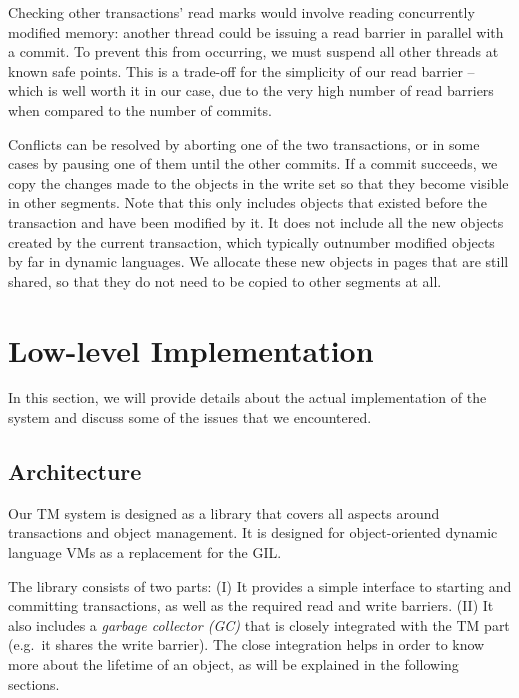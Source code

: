 \documentclass{sigplanconf}
\begin{document}
\begin{description}
  Checking other transactions' read marks would involve reading
  concurrently modified memory: another thread could be issuing a read
  barrier in parallel with a commit.  To prevent this from occurring, we
  must suspend all other threads at known safe points.  This is a
  trade-off for the simplicity of our read barrier -- which is well
  worth it in our case, due to the very high number of read barriers
  when compared to the number of commits.

\end{description}

Conflicts can be resolved by aborting one of the two transactions, or
in some cases by pausing one of them until the other commits.  If a
commit succeeds, we copy the changes made to the objects in the write
set so that they become visible in other segments.  Note that this
only includes objects that existed before the transaction and have
been modified by it.  It does not include all the new objects created
by the current transaction, which typically outnumber modified objects
by far in dynamic languages.  We allocate these new objects in pages
that are still shared, so that they do not need to be copied to other
segments at all.



\section{Low-level Implementation\label{sub:Low-level-Implementation}}

In this section, we will provide details about the actual
implementation of the system and discuss some of the issues that we
encountered.


\subsection{Architecture}

Our TM system is designed as a library that covers all aspects around
transactions and object management. It is designed for object-oriented
dynamic language VMs as a replacement for the GIL.

The library consists of two parts: (I) It provides a simple interface
to starting and committing transactions, as well as the required read
and write barriers. (II) It also includes a \emph{garbage collector
(GC)} that is closely integrated with the TM part (e.g.\ it shares the
write barrier). The close integration helps in order to know more
about the lifetime of an object, as will be explained in the following
sections.
\end{document}
